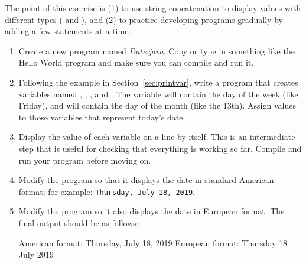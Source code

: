 \begin{exercise}  %
\label{ex:date}

The point of this exercise is (1) to use string concatenation to display values with different types ( and ), and (2) to practice developing programs gradually by adding a few statements at a time.

\begin{enumerate}

\item Create a new program named {\it Date.java}.
Copy or type in something like the Hello World program and make sure you can compile and run it.

\item Following the example in Section~\ref{sec:printvar}, write a program that creates variables named , , , and .
The variable  will contain the day of the week (like Friday), and  will contain the day of the month (like the 13th).
Assign values to those variables that represent today's date.

\item Display the value of each variable on a line by itself.
This is an intermediate step that is useful for checking that everything is working so far.
Compile and run your program before moving on.

\item Modify the program so that it displays the date in standard American format; for example: {\tt Thursday, July 18, 2019}.

\item Modify the program so it also displays the date in European format.
The final output should be as follows:

\begin{stdout}
American format: Thursday, July 18, 2019
European format: Thursday 18 July 2019
\end{stdout}

\end{enumerate}

\end{exercise}


